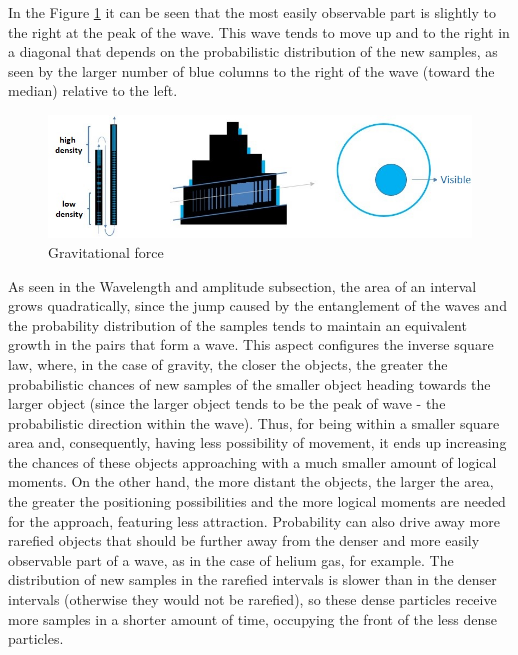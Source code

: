 In the Figure \ref{fig:consciousness_gravitational_force} it can be seen that the most easily observable part is slightly to the right at the peak of the wave. This wave tends to move up and to the right in a diagonal that depends on the probabilistic distribution of the new samples, as seen by the larger number of blue columns to the right of the wave (toward the median) relative to the left.
	\begin{figure}[H]
	\caption{Gravitational force}
	\label{fig:consciousness_gravitational_force}
	\centering
	\includegraphics[scale=.7]{sections/images/consciousness_gravitational_force.jpg}
	\end{figure}

As seen in the Wavelength and amplitude subsection, the area of an interval grows quadratically, since the jump caused by the entanglement of the waves and the probability distribution of the samples tends to maintain an equivalent growth in the pairs that form a wave. This aspect configures the inverse square law, where, in the case of gravity, the closer the objects, the greater the probabilistic chances of new samples of the smaller object heading towards the larger object (since the larger object tends to be the peak of wave - the probabilistic direction within the wave). Thus, for being within a smaller square area and, consequently, having less possibility of movement, it ends up increasing the chances of these objects approaching with a much smaller amount of logical moments. On the other hand, the more distant the objects, the larger the area, the greater the positioning possibilities and the more logical moments are needed for the approach, featuring less attraction. Probability can also drive away more rarefied objects that should be further away from the denser and more easily observable part of a wave, as in the case of helium gas, for example. The distribution of new samples in the rarefied intervals is slower than in the denser intervals (otherwise they would not be rarefied), so these dense particles receive more samples in a shorter amount of time, occupying the front of the less dense particles.

